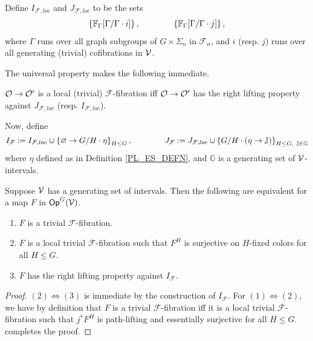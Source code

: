 \documentclass[a4paper,10pt
,draft
]{article}%
\renewcommand{\F}{\mathcal F}
\newcommand{\J}{\mathbb J}
\renewcommand{\1}{\eta}%
\begin{document}
Define $I_{\F,loc}$ and $J_{\F, loc}$ to be the sets
\begin{align*}
  \left\{\mathbb F_\Gamma[\Gamma/\Gamma \cdot i]\right\}, \qquad \qquad \left\{\mathbb F_\Gamma[\Gamma/\Gamma \cdot j]\right\},
\end{align*}
where $\Gamma$ runs over all graph subgroups of $G \times \Sigma_n$ in $\F_n$,
and $i$ (resp. $j$) runs over all generating (trivial) cofibrations in $\mathcal V$.

The universal property makes the following immediate.
\begin{corollary}
      $\mathcal{O} \to \mathcal{O}'$ is a local (trivial) $\F$-fibration iff
      $\mathcal{O} \to \mathcal{O}'$ has the right lifting property against $J_{\F, loc}$ (resp. $I_{\F, loc}$).
\end{corollary}

Now, define
\begin{equation}
      I_{\F}:= I_{\F, loc} \mathbin{\cup} \set{\varnothing \to G/H \cdot \1}_{H\leq G},
      \qquad \qquad
      J_{\F} := J_{\F, loc} \mathbin{\cup} \set{G/H \cdot (\1 \to \J)}_{H\leq G,\ \J\in\mathbb{G}}
\end{equation}
where $\1$ defined as in Definition \ref{PL_ES_DEFN}, and $\mathbb{G}$ is a generating set of $\mathcal V$-intervals. 

\begin{lemma}
      \label{CAV_4.8}
      Suppose $\mathcal V$ has a generating set of intervals.
      Then the following are equivalent for a map $F$ in $\mathsf{Op}^G(\mathcal V)$.
      \begin{enumerate}[label = (\arabic*)]
      \item $F$ is a trivial $\F$-fibration.
      \item $F$ is a local trivial $\F$-fibration such that $F^H$ is surjective on $H$-fixed colors for all $H\leq G$.
      \item $F$ has the right lifting property against $I_{\F}$.
      \end{enumerate}
\end{lemma}
\begin{proof}
      $(2) \Leftrightarrow (3)$ is immediate by the construction of $I_{\F}$.
      For $(1) \Leftrightarrow (2)$, we have by definition that
      $F$ is a trivial $\F$-fibration
      iff
      it is a local trivial $\F$-fibration such that $j^*F^H$ is path-lifting and essentially surjective for all $H\leq G$.
      \cite[2.4]{BM13} completes the proof. 
\end{proof}
\end{document}
